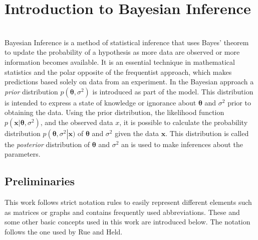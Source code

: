 %
\chapter{Introduction to Bayesian Inference}
\label{sec:bayes}
 \\
Bayesian Inference is a method of statistical inference that uses Bayes' theorem to update the probability of a hypothesis as more data are observed or more information becomes available. It is an essential technique in mathematical statistics and the polar opposite of the frequentist approach, which makes predictions based solely on data from an experiment. In the Bayesian approach a \textit{prior} distribution $p\left(\pmb{\theta}, \sigma^2\right)$ is introduced as part of the model. This distribution is intended to express a state of knowledge or ignorance about $\pmb{\theta}$ and $\sigma^2$ prior to obtaining the data. Using the prior distribution, the likelihood function $p\left(\pmb{x}|\pmb{\theta},\sigma^2\right)$, and the observed data $x$, it is possible to calculate the probability distribution $p\left(\pmb{\theta},\sigma^2\right|\pmb{x})$ of $\pmb{\theta}$ and $\sigma^2$ given the data $\pmb{x}$. This distribution is called the \textit{posterior} distribution of $\pmb{\theta}$ and $\sigma^2$ an is used to make inferences about the parameters\autocite[Cf.][]{box2011bayesian}.
\section{Preliminaries}
This work follows strict notation rules to easily represent different elements such as matrices or graphs and contains frequently used abbreviations. These and some other basic concepts used in this work are introduced below. The notation follows the one used by Rue and Held\autocite[Cf.][]{rue2005gaussian}.

